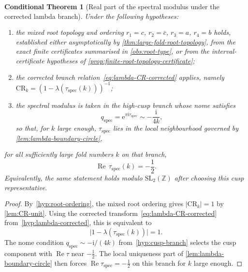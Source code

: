\documentclass[11pt,a4paper]{article}
\theoremstyle{plain}
\newtheorem{conditionaltheorem}[theorem]{Conditional Theorem}
\theoremstyle{definition}
\theoremstyle{remark}
\DeclareMathOperator{\Real}{Re}
\newcommand{\ZZ}{\mathbb{Z}}
\newcommand{\ee}{\mathrm{e}}
\newcommand{\ii}{\mathrm{i}}
\newcommand{\abs}[1]{\lvert #1 \rvert}
\begin{document}
\begin{conditionaltheorem}[Real part of the spectral modulus under the
  corrected lambda branch]
\label{cond:tau-univ}
Under the following hypotheses:
\begin{enumerate}[label=\textup{(H\arabic*)},nosep,leftmargin=*]
\item\label{hyp:root-ordering}
  the mixed root topology and ordering $r_1=c$, $r_2=\bar c$,
  $r_3=a$, $r_4=b$ holds, established either asymptotically by
  \cref{thm:large-fold-root-topology}, from the exact finite
  certificates summarised in \cref{obs:root-type}, or from the
  interval-certificate hypotheses of
  \cref{prop:finite-root-topology-certificate};
\item\label{hyp:lambda-corrected}
  the corrected branch relation~\eqref{eq:lambda-CR-corrected} applies,
  namely $\mathrm{CR}_k = (1-\lambda(\tau_{\mathrm{spec}}(k)))^{-1}$;
\item\label{hyp:cusp-branch}
  the spectral modulus is taken in the high-cusp branch whose nome
  satisfies
  \[
    q_{\mathrm{spec}} = \ee^{\pi\ii\tau_{\mathrm{spec}}}
    \sim -\frac{\ii}{4k},
  \]
  so that, for $k$ large enough, $\tau_{\mathrm{spec}}$ lies in the
  local neighbourhood governed by
  \cref{lem:lambda-boundary-circle},
\end{enumerate}
for all sufficiently large fold numbers $k$ on that branch,
\begin{equation}\label{eq:Re-tau-spec-minus-half}
  \Real\,\tau_{\mathrm{spec}}(k)=-\frac12 .
\end{equation}
Equivalently, the same statement holds modulo $\mathrm{SL}_2(\ZZ)$
after choosing this cusp representative.
\end{conditionaltheorem}

\begin{proof}
By~\ref{hyp:root-ordering}, the mixed root ordering gives
$\abs{\mathrm{CR}_k}=1$ by \cref{lem:CR-unit}.  Using the corrected
transform~\eqref{eq:lambda-CR-corrected} from~\ref{hyp:lambda-corrected}, this is equivalent to
\[
  \abs{1-\lambda(\tau_{\mathrm{spec}}(k))}=1.
\]
The nome condition $q_{\mathrm{spec}}\sim-\ii/(4k)$
from~\ref{hyp:cusp-branch} selects the cusp component with
$\Real\tau$ near $-\tfrac12$.  The local uniqueness
part of \cref{lem:lambda-boundary-circle} then forces
$\Real\tau_{\mathrm{spec}}=-\tfrac12$ on this branch for $k$ large
enough.
\end{proof}
\end{document}

